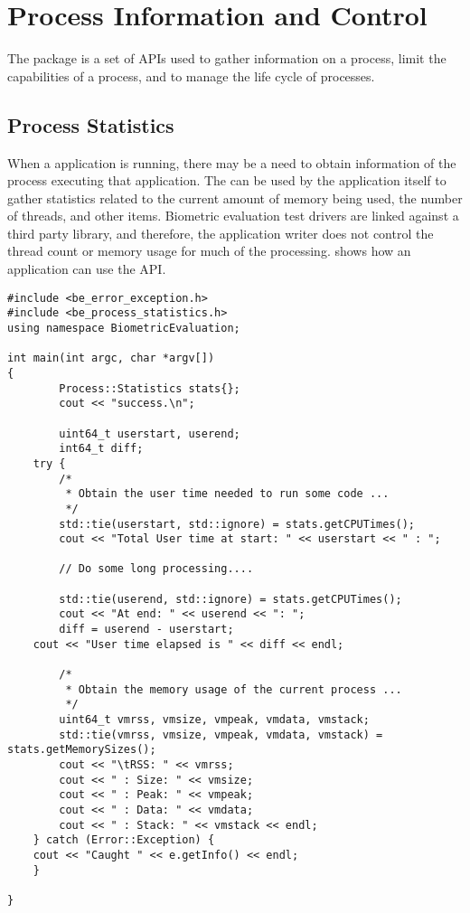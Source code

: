 %
%
\chapter{Process Information and Control}
\label{chp-process}

The  package is a set of APIs used to gather information on
a process, limit the capabilities of a process, and to manage the life cycle
of processes.

\section{Process Statistics}
\label{sec-process_statistics}

When a application is running, there may be a need to obtain information of the
process executing that application. The  can be used
by the application itself to gather statistics related to the current amount
of memory
being used, the number of threads, and other items. Biometric evaluation test
drivers are linked against a third party library, and therefore, the application
writer does not control the thread count or memory usage for much of the
processing.  shows how an application can
use the  API.

\begin{lstlisting}[caption={Gathering Process Statistics}, label=lst:processstatisticsuse]
#include <be_error_exception.h>
#include <be_process_statistics.h>
using namespace BiometricEvaluation;

int main(int argc, char *argv[])
{
        Process::Statistics stats{};
        cout << "success.\n";

        uint64_t userstart, userend;
        int64_t diff;
    try {
        /*
         * Obtain the user time needed to run some code ...
         */
        std::tie(userstart, std::ignore) = stats.getCPUTimes();
        cout << "Total User time at start: " << userstart << " : ";

        // Do some long processing....

        std::tie(userend, std::ignore) = stats.getCPUTimes();
        cout << "At end: " << userend << ": ";
        diff = userend - userstart;
	cout << "User time elapsed is " << diff << endl;

        /*
         * Obtain the memory usage of the current process ...
         */
        uint64_t vmrss, vmsize, vmpeak, vmdata, vmstack;
        std::tie(vmrss, vmsize, vmpeak, vmdata, vmstack) = stats.getMemorySizes();
        cout << "\tRSS: " << vmrss;
        cout << " : Size: " << vmsize;
        cout << " : Peak: " << vmpeak;
        cout << " : Data: " << vmdata;
        cout << " : Stack: " << vmstack << endl;
    } catch (Error::Exception) {
	cout << "Caught " << e.getInfo() << endl;
    }

}
\end{lstlisting}

